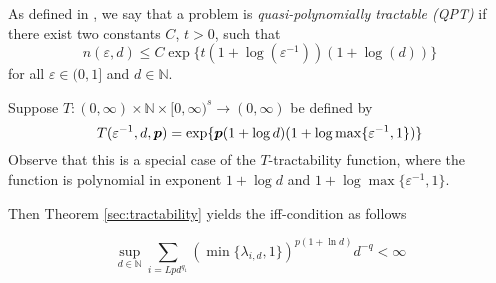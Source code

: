 \documentclass[11pt,a4paper]{article}
\newcommand{\kachi}[1]{\begingroup\color{ForestGreen}#1\endgroup}
\begin{document}



\kachi{
\begin{example}
\begin{definition}
    As defined in \cite{GW11}, we say that a problem is \emph{ quasi-polynomially tractable (QPT)} if there exist two constants $C$, $t > 0$, such that
\begin{equation}\label{expqpt}
    n(\varepsilon,d) \leq C\exp\{t(1+\log(\varepsilon^{-1}))(1+\log(d))\}
\end{equation}
for all $\varepsilon \in (0,1]$ and $d\in\mathbb{N}$.\\
\end{definition}
Suppose $ T :(0,\infty) \times \mathbb{N} \times [0,\infty)^s \rightarrow (0,\infty)$
be defined by
\[
 T(\varepsilon^{-1},d,\boldsymbol{p})= \exp\{\boldsymbol{p}(1+\log d)(1+\log\max\{\varepsilon^{-1},1\})\}
\]
Observe that this is a special case of the $T$-tractability function, where the function is polynomial in exponent $1+\log d$ and $1+\log\max\{\varepsilon^{-1},1\}$.

Then Theorem \ref{sec:tractability} yields the iff-condition as follows

\[
\sup_{d\in\mathbb{N}}\sum_{i=Lpd^{q_1}} \left(\min\{\lambda_{i,d},1\} \right)^{p(1+\ln d)}d^{-q} < \infty
\]
\end{example}
}
\end{document}
